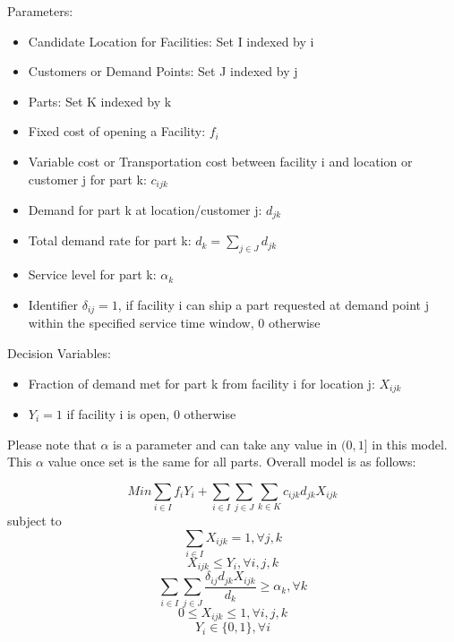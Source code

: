 \documentclass[12pt]{article}
\numberwithin{equation}{section}
\begin{document}
Parameters:
\begin{itemize}
\item 
Candidate Location for Facilities: Set I indexed by i
\item 
Customers or Demand Points: Set J indexed by j
\item 
Parts: Set K indexed by k
\item 
Fixed cost of opening a Facility: $f_i$
\item 
Variable cost or Transportation cost between facility i and location or customer j for part k: $c_{ijk}$
\item 
Demand for part k at location/customer j: $d_{jk}$
\item
Total demand rate for part k: $d_{k} = \sum_{j\in J}d_{jk}$
\item
Service level for part k: $\alpha_k$
\item
Identifier $\delta_{ij} = 1$, if facility i can ship a part requested at demand point j within the specified service time window, 0 otherwise  
\end{itemize}

 
Decision Variables:
\begin{itemize}
\item
Fraction of demand met for part k from facility i for location j: $X_{ijk}$
\item
$Y_i = 1$ if facility i is open, 0 otherwise
\end{itemize}
Please note that $\alpha$ is a parameter and can take any value in $(0,1]$ in this model. This $\alpha$ value once set is the same for all parts. Overall model is as follows:

\begin{equation}
\label{obj}
Min \sum_{i\in I}f_{i}Y_{i} + \sum_{i\in I}\sum_{j\in J}\sum_{k\in K}c_{ijk}d_{jk}X_{ijk}  
\end{equation}
\hspace{2cm} subject to
\begin{equation}
\label{demand}
\sum_{i\in I}X_{ijk} = 1,  \forall j,k  
\end{equation}
\begin{equation}
\label{supply}
X_{ijk} \leq Y_{i},  \forall i,j,k  
\end{equation}
\begin{equation}
\label{compound}
\sum_{i\in I}\sum_{j\in J}\frac{\delta_{ij}d_{jk}X_{ijk}}{d_k} \geq \alpha_{k},  \forall k
\end{equation}
\begin{equation}
\label{Fraction}
0 \leq X_{ijk} \leq 1,  \forall i,j,k 
\end{equation}
\begin{equation}
\label{Indicator}
Y_{i} \in \{0,1\}, \forall i 
\end{equation}
\end{document}
